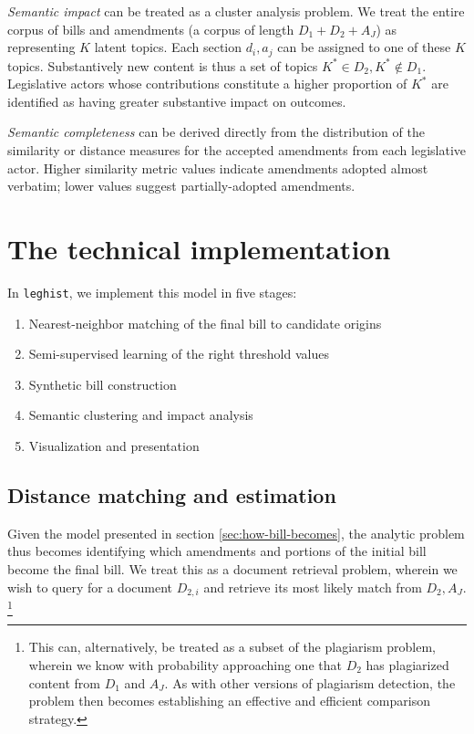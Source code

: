 \documentclass[11pt]{article}
\begin{document}
\textit{Semantic impact} can be treated as a cluster analysis
problem. We treat the entire corpus of bills and amendments (a corpus
of length $D_1 + D_2 + A_J$) as representing $K$ latent topics. Each
section $d_i, a_j$ can be assigned to one of these $K$
topics. Substantively new content is thus a set of topics $K^* \in
D_2, K^* \not \in D_1$. Legislative actors whose contributions
constitute a higher proportion of $K^*$ are identified as having
greater substantive impact on outcomes. 

\textit{Semantic completeness} can be derived directly from the
distribution of the similarity or distance measures for the accepted
amendments from each legislative actor. Higher similarity
metric values indicate amendments adopted almost verbatim; lower
values suggest partially-adopted amendments. 


\section{The technical implementation}
\label{sec:legisl-sect-match}

In \texttt{leghist}, we implement this model in five stages:
\begin{enumerate}
\item Nearest-neighbor matching of the final bill to candidate origins
\item Semi-supervised learning of the right threshold values
\item Synthetic bill construction
\item Semantic clustering and impact analysis
\item Visualization and presentation
\end{enumerate}

\subsection{Distance matching and estimation}
\label{sec:dist-match-estim}

Given the model presented in section \ref{sec:how-bill-becomes}, the
analytic problem thus becomes identifying which amendments and
portions of the initial bill become the final bill. We treat this as a
document retrieval problem, wherein we wish to query for a document
$D_{2,i}$ and retrieve its most likely match from $D_2,
A_J$. \footnote{This can, alternatively, be treated as a
subset of the plagiarism problem, wherein we know with probability
approaching one that $D_2$ has plagiarized content from $D_1$ and
$A_J$. As with other versions of plagiarism detection, the problem
then becomes establishing an effective and efficient comparison
strategy.}
\end{document}
